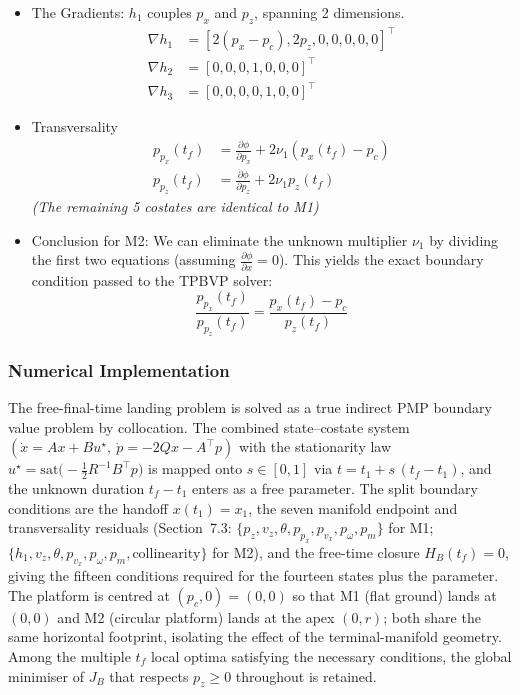 \documentclass[letterpaper, 10 pt, conference]{ieeeconf}
\begin{document}
\begin{itemize}
\begin{itemize}
            \item The Gradients: $h_1$ couples $p_x$ and $p_z$, spanning 2 dimensions.
            \[
            \begin{aligned}
            \nabla h_1 &= [2(p_x - p_c), 2p_z, 0, 0, 0, 0, 0]^\top \\
            \nabla h_2 &= [0, 0, 0, 1, 0, 0, 0]^\top \\
            \nabla h_3 &= [0, 0, 0, 0, 1, 0, 0]^\top
            \end{aligned}
            \]

            \item Transversality
            \[
            \begin{aligned}
            p_{p_x}(t_f) &= \frac{\partial \phi}{\partial p_x} + 2\nu_1(p_x(t_f) - p_c) \\
            p_{p_z}(t_f) &= \frac{\partial \phi}{\partial p_z} + 2\nu_1 p_z(t_f)
            \end{aligned}
            \]
            \textit{(The remaining 5 costates are identical to M1)}

            \item Conclusion for M2: We can eliminate the unknown multiplier $\nu_1$ by dividing the first two equations (assuming $\frac{\partial \phi}{\partial x} = 0$). This yields the exact boundary condition passed to the TPBVP solver:
            \[\frac{p_{p_x}(t_f)}{p_{p_z}(t_f)} = \frac{p_x(t_f) - p_c}{p_z(t_f)}\]
        \end{itemize}  
\end{itemize}

\subsubsection*{Numerical Implementation}

The free-final-time landing problem is solved as a true indirect PMP boundary value problem by collocation. The combined state--costate system $(\dot{x}=Ax+Bu^\star,\ \dot{p}=-2Qx-A^\top p)$ with the stationarity law $u^\star=\mathrm{sat}\!\big(-\tfrac12 R^{-1}B^\top p\big)$ is mapped onto $s\in[0,1]$ via $t=t_1+s\,(t_f-t_1)$, and the unknown duration $t_f-t_1$ enters as a free parameter. The split boundary conditions are the handoff $x(t_1)=x_1$, the seven manifold endpoint and transversality residuals (Section~7.3: $\{p_z,v_z,\theta,p_{p_x},p_{v_x},p_\omega,p_m\}$ for M1; $\{h_1,v_z,\theta,p_{v_x},p_\omega,p_m,\text{collinearity}\}$ for M2), and the free-time closure $H_B(t_f)=0$, giving the fifteen conditions required for the fourteen states plus the parameter. The platform is centred at $(p_c,0)=(0,0)$ so that M1 (flat ground) lands at $(0,0)$ and M2 (circular platform) lands at the apex $(0,r)$; both share the same horizontal footprint, isolating the effect of the terminal-manifold geometry. Among the multiple $t_f$ local optima satisfying the necessary conditions, the global minimiser of $J_B$ that respects $p_z\ge0$ throughout is retained.
\end{document}
